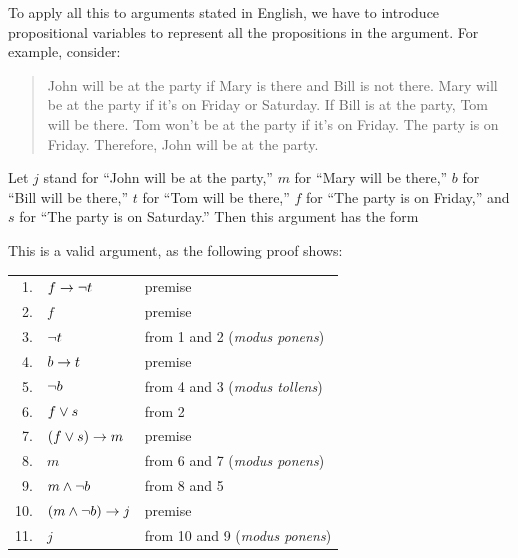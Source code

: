 To apply all this to arguments stated in English, we have to
introduce propositional variables to represent all the propositions
in the argument.  For example, consider:
\begin{quote}
John will be at the party if Mary is there and Bill is not there.
Mary will be at the party if it's on Friday or Saturday.
If Bill is at the party, Tom will be there.  Tom won't be at
the party if it's on Friday.  The party is on Friday.
Therefore, John will be at the party.
\end{quote}
Let $j$ stand for ``John will be at the party,'' $m$ for
``Mary will be there,'' $b$ for ``Bill will be there,''
$t$ for ``Tom will be there,'' $f$ for ``The party is on Friday,''
and $s$ for ``The party is on Saturday.''  Then this argument has
the form
\begin{center}
\end{center}
This is a valid argument, as the following proof shows:
\begin{center}
  \begin{tabular}{r@{\ \ }l@{\qquad}l}
     1.&$f\rightarrow\lnot t$&premise\\
     2.&$f$&premise\\
     3.&$\lnot t$&from 1 and 2 (\textit{modus ponens})\\
     4.&$b\rightarrow t$&premise\\
     5.&$\lnot b$&from 4 and 3 (\textit{modus tollens})\\
     6.&$f\vee s$&from 2\\
     7.&$(f\vee s)\rightarrow m$&premise\\
     8.&$m$&from 6 and 7 (\textit{modus ponens})\\
     9.&$m\wedge\lnot b$&from 8 and 5\\
     10.&$(m\wedge\lnot b)\rightarrow j$&premise\\
     11.&$j$&from 10 and 9 (\textit{modus ponens})\\
  \end{tabular}
\end{center}

\medskip

